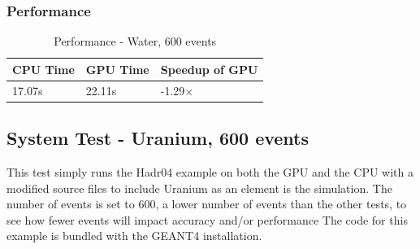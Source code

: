 \documentclass[12pt]{article}
\begin{document}
	\subsubsection{Performance}
		\begin{table}[H]
		\centering
		\caption{Performance - Water, 600 events}\label{sys3Perf}
		\begin{tabular}{lll}
		\toprule
		CPU Time& GPU Time&Speedup of GPU\\\midrule
		17.07s&22.11s&-1.29$\times$\\\bottomrule
		\end{tabular}
		\end{table}
		
\subsection{System Test - Uranium, 600 events}
This test simply runs the Hadr04 example on both the GPU and the CPU with a modified source files to include Uranium as an element is the simulation. The number of events is set to 600, a lower number of events than the other tests, to see how fewer events will impact accuracy and/or performance The code for this example is bundled with the GEANT4 installation.\\
\break
\end{document}
